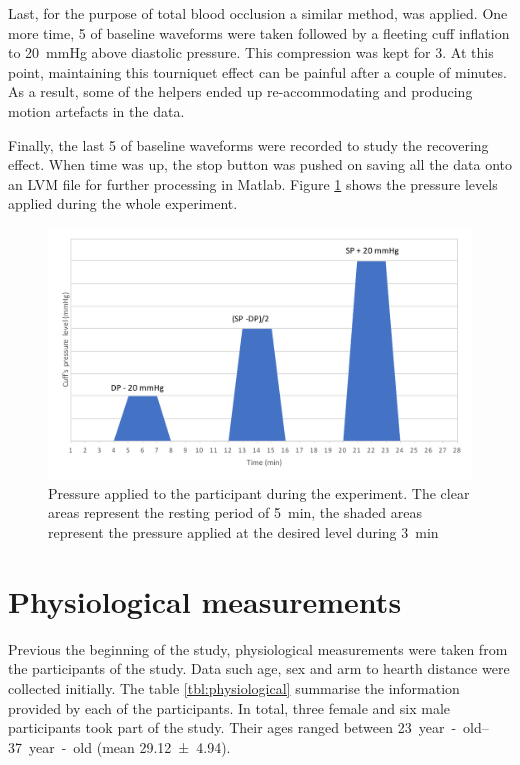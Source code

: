 Last, for the purpose of total blood occlusion a similar method, was applied. One more time, \SI{5}{\min} of baseline waveforms were taken followed by a fleeting cuff inflation to \SI{20}{\mmHg} above diastolic pressure. This compression was kept for \SI{3}{\min}. At this point, maintaining this tourniquet effect can be painful after a couple of minutes. As a result, some of the helpers ended up re-accommodating and producing motion artefacts in the data. 

Finally, the last \SI{5}{\min} of baseline waveforms were recorded to study the recovering effect. When time was up, the stop button was pushed on saving all the data onto an LVM file for further processing in Matlab. Figure \ref{fig:pressure applied} shows the pressure levels applied during the whole experiment.

\begin{figure}[!htpb]
	\centering
	\includegraphics[width=15cm,keepaspectratio]{figure3}
	\caption{Pressure applied to the participant during the experiment. The clear areas represent the resting period of \SI{5}{\minute}, the shaded areas represent the pressure applied at the desired level during \SI{3}{\minute}}
	\label{fig:pressure applied}
\end{figure}

\section{Physiological measurements}
\label{section procedure 2}
Previous the beginning of the study, physiological measurements were taken from the participants of the study. Data such age, sex and arm to hearth distance were collected initially. The table \ref{tbl:physiological} summarise the information provided by each of the participants. In total, three female and six male participants took part of the study. Their ages ranged between \SIrange{23}{37}{year-old} (mean \num{29.12(494)}). 

